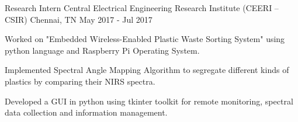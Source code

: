 \begin{cventries}
{\begin{cvitems}
      \end{cvitems}
    }
  \cventry
    {Research Intern}
    {Central Electrical Engineering Research Institute (CEERI – CSIR)}
    {Chennai, TN}
    {May 2017 - Jul 2017}
    {
      \begin{cvitems}
        \item {Worked on "Embedded Wireless-Enabled Plastic Waste Sorting System" using python language and Raspberry Pi Operating System.}
        \item {Implemented Spectral Angle Mapping Algorithm to segregate different kinds of plastics by comparing their NIRS spectra.}
        \item {Developed a GUI in python using tkinter toolkit for remote monitoring, spectral data collection and information management.}
      \end{cvitems}
    }

\end{cventries}
